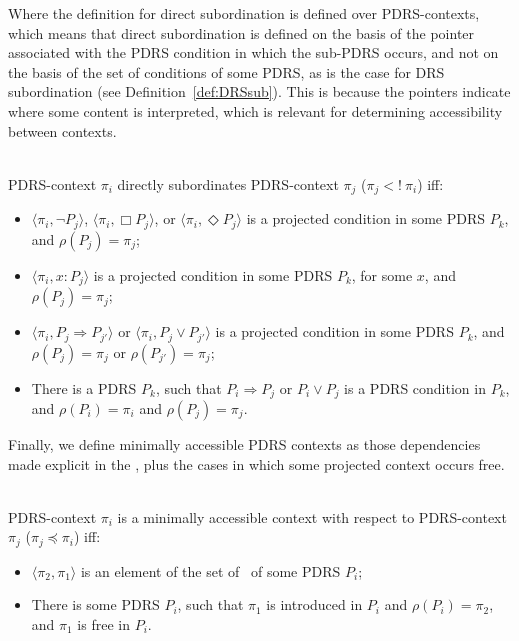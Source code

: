 \noindent Where the definition for direct subordination is defined over
PDRS-contexts, which means that direct subordination is defined on the basis
of the pointer associated with the PDRS condition in which the sub-PDRS
occurs, and not on the basis of the set of conditions of some PDRS, as is
the case for DRS subordination (see Definition~\ref{def:DRSsub}).  This is
because the pointers indicate where some content is interpreted, which is
relevant for determining accessibility between contexts.

\begin{subdefinition}~\\
PDRS-context $\pi_i$ directly subordinates PDRS-context $\pi_j$ 
($\pi_j <!~\pi_i$) iff:
  \begin{itemize}
    \item $\langle\pi_i,\neg P_j\rangle$,
      $\langle\pi_i,\Box P_j\rangle$,
      or $\langle\pi_i,\Diamond P_j\rangle$ is a projected condition in
      some PDRS $P_k$, and $\rho(P_j) = \pi_j$;
    \item $\langle\pi_i,x:P_j\rangle$ is a projected condition in some
      PDRS $P_k$, for some $x$, and $\rho(P_j) = \pi_j$;
    \item  $\langle\pi_i,P_j \Rightarrow P_{j'}\rangle$ or
      $\langle\pi_i,P_j \vee P_{j'}\rangle$ is a projected condition in
      some PDRS $P_k$, and $\rho(P_j) = \pi_j$ or $\rho(P_{j'}) = \pi_j$;
    \item There is a PDRS $P_k$, such that $P_i \Rightarrow P_j$ or 
      $P_i \vee P_j$ is a PDRS condition in $P_k$, and $\rho(P_i) = \pi_i$ 
      and $\rho(P_j) = \pi_j$. 
  \end{itemize}
\end{subdefinition}

Finally, we define minimally accessible PDRS contexts as those dependencies
made explicit in the \MAPs, plus the cases in which some projected context
occurs free.

\begin{subdefinition}~\\
PDRS-context $\pi_i$ is a minimally accessible context with
respect to PDRS-context $\pi_j$ ($\pi_j \preceq \pi_i$) iff:
  \begin{itemize}
    \item $\langle \pi_2,\pi_1\rangle$ is an element of the set of
      \MAPs~of some PDRS $P_i$;
    \item There is some PDRS $P_i$, such that $\pi_1$ is introduced in $P_i$
      and $\rho(P_i)=\pi_2$, and $\pi_1$ is free in $P_i$. 
  \end{itemize}
\end{subdefinition}

